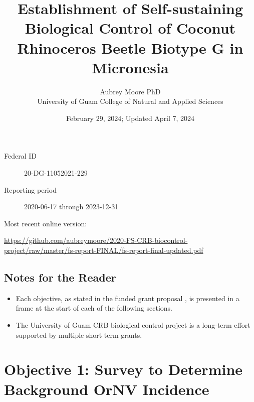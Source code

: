 \documentclass[12pt,letterpaper,english,bibliography=totocnumbered, abstract=on]{scrartcl}
\begin{document}
\titlehead{Final Report: USFS 20-DG-11052021-229}

\title{Establishment of Self-sustaining Biological Control of Coconut Rhinoceros Beetle Biotype G in Micronesia }

\author{Aubrey Moore PhD\\University of Guam College of Natural and Applied Sciences}

\date{February 29, 2024; Updated April 7, 2024}

\maketitle

\begin{description}
	\item[Federal ID] 20-DG-11052021-229
	\item[Reporting period] 2020-06-17 through 2023-12-31
\end{description}

Most recent online version: \\
\begin{footnotesize}	
	\url{https://github.com/aubreymoore/2020-FS-CRB-biocontrol-project/raw/master/fs-report-FINAL/fs-report-final-updated.pdf}
\end{footnotesize}

\clearpage

\tableofcontents

\clearpage


\newpage

\subsection*{Notes for the Reader}

\begin{itemize}

\item Each objective, as stated in the funded grant proposal \cite{mooreGrantProposalDOIOIA2020}, is presented in a frame at the start of each of the following sections. 

\item The University of Guam CRB biological control project is a long-term effort supported by multiple short-term grants.  

\end{itemize}

\clearpage

\section{Objective 1: Survey to Determine Background OrNV Incidence} 
\end{document}
